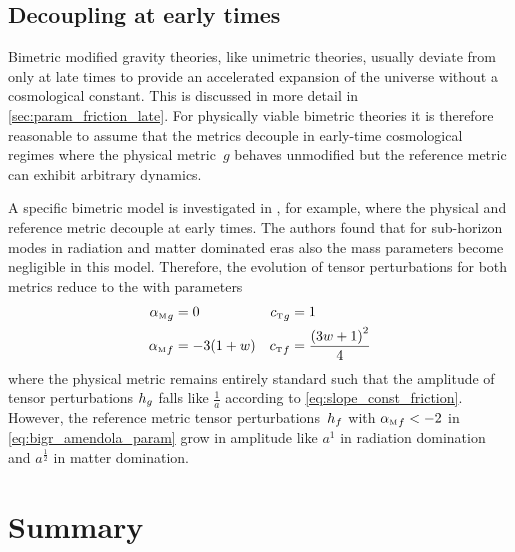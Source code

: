 \documentclass[12pt,parskip=half]{scrreprt}
\newcommand{\addref}{\todo[color=black!20]{ref.}}
\begin{document}


\section{Decoupling at early times}

Bimetric modified gravity theories, like unimetric theories, usually deviate from \LCDM only at late times to provide an accelerated expansion of the universe without a cosmological constant. \addref This is discussed in more detail in \autoref{sec:param_friction_late}. For physically viable bimetric theories it is therefore reasonable to assume that the metrics decouple in early-time cosmological regimes where the physical metric~\(g\) behaves unmodified but the reference metric can exhibit arbitrary dynamics.

A specific bimetric model is investigated in \cite{Amendola2015}, for example, where the physical and reference metric decouple at early times. The authors found that for sub-horizon modes in radiation and matter dominated eras also the mass parameters become negligible in this model. Therefore, the evolution of tensor perturbations for both metrics reduce to the  with parameters \citep{Amendola2015}
\begin{subequations}
\begin{align}
	\alphaMofmetr{g} &= 0 & \cTofmetr{g} &= 1 \\
	\alphaMofmetr{f} &= -3(1+\eosp) & \cTofmetr{f} &= \frac{\del{3\eosp + 1}^2}{4} \label{eq:bigr_amendola_param}
\end{align}
\end{subequations}
where the physical metric remains entirely standard such that the amplitude of tensor perturbations \(h_{g}\) falls like \(\frac{1}{a}\) according to \eqref{eq:slope_const_friction}. However, the reference metric tensor perturbations~\(h_{f}\) with \({\alpha_{\textnormal{\tiny{M}}}}_{f}<-2\) in \eqref{eq:bigr_amendola_param} grow in amplitude like \(a^1\) in radiation domination and \(a^\frac{1}{2}\) in matter domination.



\chapter{Summary}\label{ch:summary}
\end{document}
